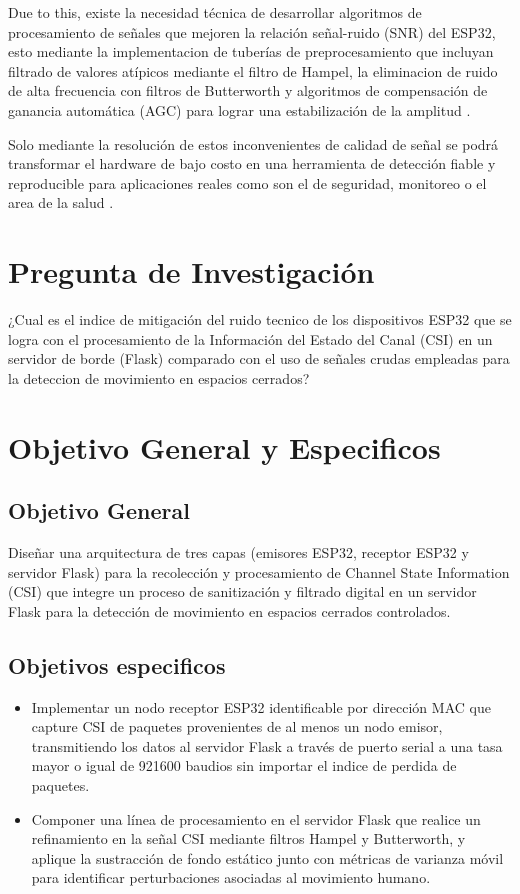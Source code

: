 \documentclass[12pt, a4paper]{article}
\begin{document}
Due to this, existe la necesidad técnica de desarrollar algoritmos de procesamiento de señales que mejoren la relación señal-ruido (SNR) del ESP32, esto mediante la implementacion de tuberías de preprocesamiento que incluyan filtrado de valores atípicos mediante el filtro de Hampel, la eliminacion de ruido de alta frecuencia con filtros de Butterworth y algoritmos de compensación de ganancia automática (AGC) para lograr una estabilización de la amplitud\cite{kim2026csi} \cite{yin2025ciuavmultitask3dindoor} \cite{gaire2026staticsense}.

Solo mediante la resolución de estos inconvenientes de calidad de señal se podrá transformar el hardware de bajo costo en una herramienta de detección fiable y reproducible para aplicaciones reales como son el de seguridad, monitoreo o el area de la salud\cite{kim2026csi} \cite{yin2025ciuavmultitask3dindoor} \cite{chaudhari2026device}.

\section{Pregunta de Investigación}

¿Cual es el indice de mitigación del ruido tecnico de los dispositivos ESP32 que se logra con el procesamiento de la Información del Estado del Canal (CSI) en un servidor de borde (Flask) comparado con el uso de señales crudas empleadas para la deteccion de movimiento en espacios cerrados?

\section{Objetivo General y Especificos}
\subsection{Objetivo General}
Diseñar una arquitectura de tres capas (emisores ESP32, receptor ESP32 y servidor Flask) para la recolección y procesamiento de Channel State Information (CSI) que integre un proceso de sanitización y filtrado digital en un servidor Flask para la detección de movimiento en espacios cerrados controlados.
\subsection{Objetivos especificos}
\begin{itemize}
\item Implementar un nodo receptor ESP32 identificable por dirección MAC que capture CSI de paquetes provenientes de al menos un nodo emisor, transmitiendo los datos al servidor Flask a través de puerto serial a una tasa mayor o igual de 921600 baudios sin importar el indice de perdida de paquetes.
\item Componer una línea de procesamiento en el servidor Flask que realice un refinamiento en la señal CSI mediante filtros Hampel y Butterworth, y aplique la sustracción de fondo estático junto con métricas de varianza móvil para identificar perturbaciones asociadas al movimiento humano.
\end{itemize}
\end{document}
